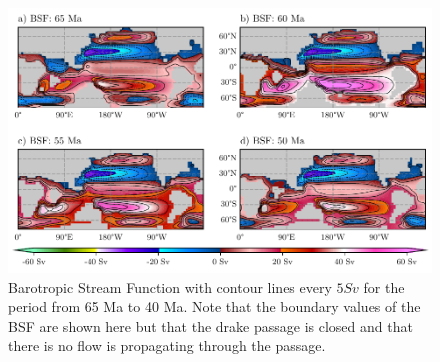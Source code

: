 \documentclass[a4paper]{article}
\begin{document}
\begin{multicols}{2}


\end{multicols}
\begin{figure}[H]

\includegraphics[width=0.95\linewidth]{BSF_1.pdf}
\caption{Barotropic Stream Function with contour lines every $5 Sv$ for the period from 65 Ma to 40 Ma. Note that the boundary values of the BSF are shown here but that the drake passage is closed and that there is no flow is propagating through the passage.}
\label{fig:bsf_total1}
\end{figure}
\end{document}
